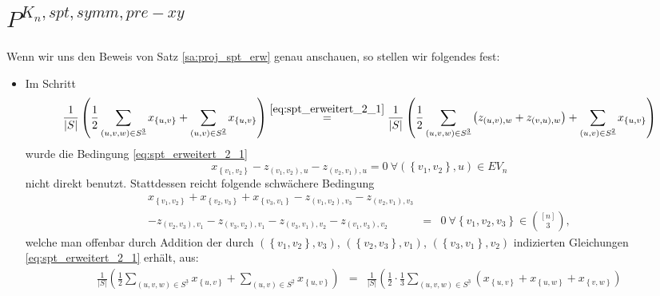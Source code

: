 \documentclass[10p,a4paper,BCOR = 12mm, DIV=15]{scrbook}
\begin{document}
{\section{$P^{K_n, spt, symm, pre-xy}$}

Wenn wir uns den Beweis von Satz \ref{sa:proj_spt_erw} genau anschauen, so stellen wir folgendes fest:
\begin{itemize}
\item Im Schritt
\begin{displaymath}
\frac{1}{\left|S\right|} \left(\frac{1}{2} \sum_{\left(u, v, w\right) \in S^{\underline{3}}} x_{\left\{u, v\right\}} + \sum_{\left(u, v\right) \in S^{\underline{2}}} x_{\left\{u, v\right\}} \right) 
\stackrel{\eqref{eq:spt_erweitert_2_1}}{=} \frac{1}{\left|S\right|} \left(\frac{1}{2} \sum_{\left(u, v, w\right) \in S^{\underline{3}}} \left(z_{\left(u, v\right), w} + z_{\left(v, u\right), w}\right) + \sum_{\left(u, v\right) \in S^{\underline{2}}} x_{\left\{u, v\right\}} \right)
\end{displaymath}
wurde die Bedingung \eqref{eq:spt_erweitert_2_1}
\begin{displaymath}
x_{\left\{v_1, v_2\right\}} - z_{\left(v_1, v_2\right), u} - z_{\left(v_2, v_1\right), u} = 0\ \forall \left(\left\{v_1, v_2\right\}, u\right)\in EV_n
\end{displaymath}
nicht direkt benutzt. Stattdessen reicht folgende schwächere Bedingung
\begin{eqnarray}
x_{\left\{v_1, v_2\right\}} + x_{\left\{v_2, v_3\right\}} + x_{\left\{v_3, v_1\right\}} 
- z_{\left(v_1, v_2\right), v_3} - z_{\left(v_2, v_1\right), v_3} & & \nonumber \\
- z_{\left(v_2, v_3\right), v_1} - z_{\left(v_3, v_2\right), v_1} 
- z_{\left(v_3, v_1\right), v_2} - z_{\left(v_1, v_3\right), v_2}
& = & 0\ \forall \left\{v_1, v_2, v_3\right\}\in {\left[n\right] \choose 3}, \label{eq:erw_symm_eq_neu1}
\end{eqnarray}
welche man offenbar durch Addition der durch $\left(\left\{v_1, v_2\right\}, v_3\right)$, $\left(\left\{v_2, v_3\right\}, v_1\right)$, $\left(\left\{v_3, v_1\right\}, v_2\right)$ indizierten Gleichungen \eqref{eq:spt_erweitert_2_1} erhält, aus:
\begin{eqnarray*}
\frac{1}{\left|S\right|} \left(\frac{1}{2} \sum_{\left(u, v, w\right) \in S^{\underline{3}}} x_{\left\{u, v\right\}} + \sum_{\left(u, v\right) \in S^{\underline{2}}} x_{\left\{u, v\right\}} \right) 
& = & \frac{1}{\left|S\right|} \left(\frac{1}{2} \cdot \frac{1}{3} \sum_{\left(u, v, w\right) \in S^{\underline{3}}} \left(x_{\left\{u, v\right\}} + x_{\left\{u, w\right\}} + x_{\left\{v, w\right\}}\right) \right. \\

\end{eqnarray*}
\end{itemize}}
\end{document}
